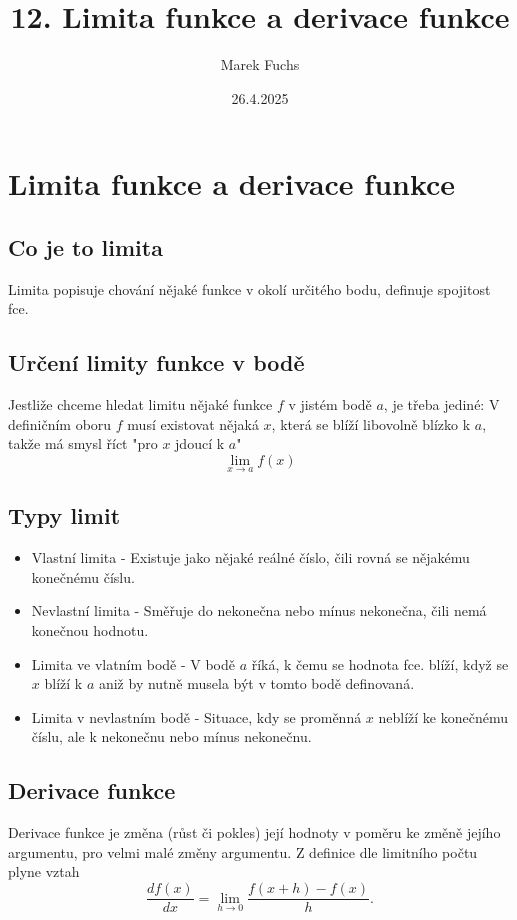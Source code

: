 \title{ 12. Limita funkce a derivace funkce}
\author{Marek Fuchs}
\date{26.4.2025}

\maketitle



\section{Limita funkce a derivace funkce}
\subsection{Co je to limita}
Limita popisuje chování nějaké funkce v okolí určitého bodu, definuje spojitost fce.

\subsection{Určení limity funkce v bodě}
Jestliže chceme hledat limitu nějaké funkce $f$ v jistém bodě $a$, je třeba jediné: V definičním oboru $f$ musí existovat nějaká $x$, která se blíží libovolně blízko k $a$, takže má smysl říct "pro $x$ jdoucí k $a$"\\
$$\lim_{x\to a} f(x)$$

\subsection{Typy limit}
\begin{itemize}
            \item Vlastní limita - Existuje jako nějaké reálné číslo, čili rovná se nějakému konečnému číslu.
            \item Nevlastní limita - Směřuje do nekonečna nebo mínus nekonečna, čili nemá konečnou hodnotu.
            \item Limita ve vlatním bodě - V bodě $a$ říká, k čemu se hodnota fce. blíží, když se $x$ blíží k $a$ aniž by nutně musela být v tomto bodě definovaná.
            \item Limita v nevlastním bodě - Situace, kdy se proměnná $x$ neblíží ke konečnému číslu, ale k nekonečnu nebo mínus nekonečnu.
        \end{itemize}
\subsection{Derivace funkce}
Derivace funkce je změna (růst či pokles) její hodnoty v poměru ke změně jejího argumentu, pro velmi malé změny argumentu. Z definice dle limitního počtu plyne vztah 
$$
\frac{df(x)}{dx} = \lim_{h\rightarrow0}{\frac{f(x+h)-f(x)}{h}}.
$$

